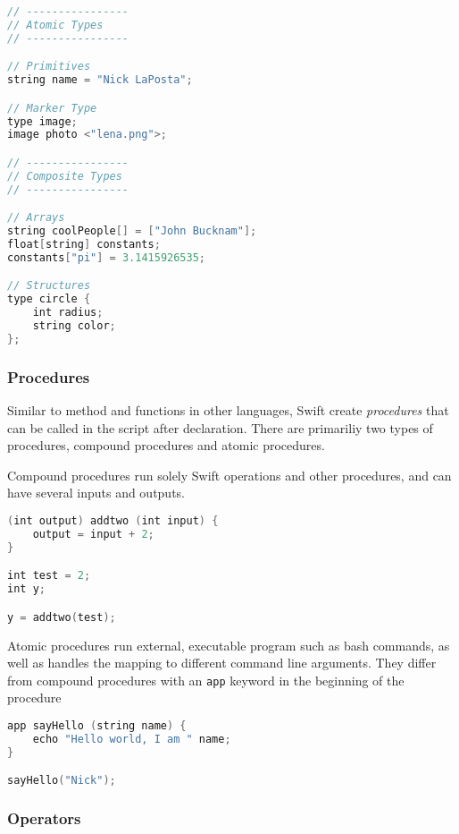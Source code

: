         \begin{lstlisting}[language=swift]
// ----------------
// Atomic Types
// ----------------

// Primitives
string name = "Nick LaPosta";

// Marker Type
type image;
image photo <"lena.png">;

// ----------------
// Composite Types
// ----------------

// Arrays
string coolPeople[] = ["John Bucknam"];
float[string] constants;
constants["pi"] = 3.1415926535;

// Structures
type circle {
    int radius;
    string color;
};
        \end{lstlisting}

    \subsubsection{Procedures}
        Similar to method and functions in other languages, Swift create \textit{procedures} that can be called in the script after declaration. There are primariliy two types of procedures, compound procedures and atomic procedures.

        Compound procedures run solely Swift operations and other procedures, and can have several inputs and outputs.

        \begin{lstlisting}[language=swift]
(int output) addtwo (int input) {
    output = input + 2;
}

int test = 2;
int y;

y = addtwo(test);
        \end{lstlisting}

        Atomic procedures run external, executable program such as bash commands, as well as handles the mapping to different command line arguments. They differ from compound procedures with an \texttt{app} keyword in the beginning of the procedure

        \begin{lstlisting}[language=swift]
app sayHello (string name) {
    echo "Hello world, I am " name;
}

sayHello("Nick");
    \end{lstlisting}

    \subsubsection{Operators}

